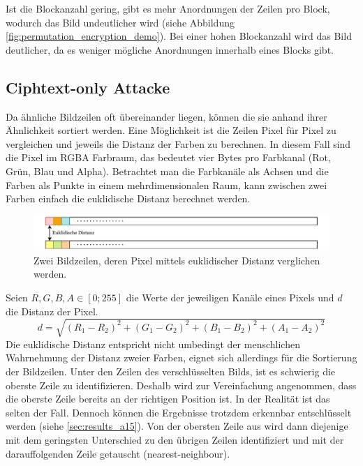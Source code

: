 Ist die Blockanzahl gering, gibt es mehr Anordnungen der Zeilen pro Block, wodurch das Bild
undeutlicher wird (siehe Abbildung \ref{fig:permutation_encryption_demo}). Bei einer
hohen Blockanzahl wird das Bild deutlicher, da es weniger mögliche Anordnungen innerhalb eines Blocks gibt.
\subsection{Ciphtext-only Attacke}
Da ähnliche Bildzeilen oft übereinander liegen, können die sie anhand ihrer Ähnlichkeit sortiert werden. Eine Möglichkeit ist
die Zeilen Pixel für Pixel zu vergleichen und jeweils die Distanz der Farben zu berechnen. In diesem Fall sind die Pixel
im RGBA Farbraum, das bedeutet vier Bytes pro Farbkanal (Rot, Grün, Blau und Alpha). Betrachtet man die Farbkanäle als Achsen und die
Farben als Punkte in einem mehrdimensionalen Raum, kann zwischen zwei Farben einfach die euklidische Distanz berechnet werden.
\begin{figure}[h]
    \centering
    \includegraphics[width=\textwidth]{img/row_comparison.pdf}
    \caption{Zwei Bildzeilen, deren Pixel mittels euklidischer Distanz verglichen werden.}
\end{figure}
Seien $R,G,B,A\in\left[0;255\right]$ die Werte der jeweiligen Kanäle eines Pixels und $d$ die Distanz der Pixel.
\[
    d = \sqrt{(R_1 - R_2)^2 + (G_1 - G_2)^2 + (B_1 - B_2)^2 + (A_1 - A_2)^2}
\]
Die euklidische Distanz entspricht nicht umbedingt der menschlichen Wahrnehmung der Distanz zweier Farben, eignet sich allerdings
für die Sortierung der Bildzeilen. Unter den Zeilen des verschlüsselten Bilds, ist es schwierig die oberste Zeile zu identifizieren. Deshalb 
wird zur Vereinfachung angenommen, dass die oberste Zeile bereits an der richtigen Position ist. In der Realität ist das selten der Fall.
Dennoch können die Ergebnisse trotzdem erkennbar entschlüsselt werden (siehe \ref{sec:results_a15}). Von der obersten Zeile aus wird dann 
diejenige mit dem geringsten Unterschied zu den übrigen Zeilen identifiziert und mit der darauffolgenden Zeile getauscht (nearest-neighbour).

